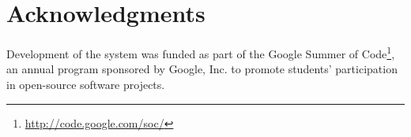 \documentclass[10pt,a5paper,twoside]{article}
\begin{document}
\section*{Acknowledgments}
Development of the system was funded as part of the Google Summer of Code\footnote{\url{http://code.google.com/soc/}}, an annual program sponsored by Google, Inc. to promote students' participation in open-source software projects.




\nocite{lewis09}
\end{document}
